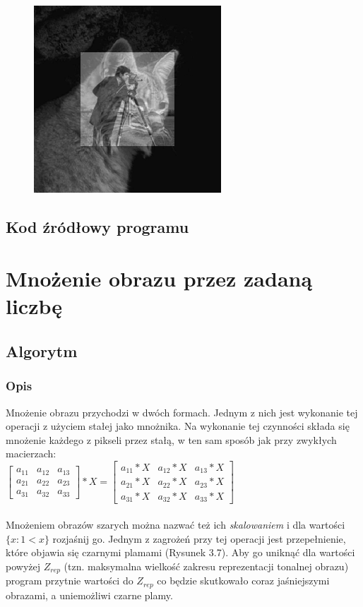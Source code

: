 \documentclass[a4paper,12pt]{book}
\begin{document}
\begin{figure}[H]
	\includegraphics[width=7cm, height=7cm]{2/sum-gray-images-2-norm.png}
\end{figure}

\subsection*{Kod źródłowy programu}

\section{Mnożenie obrazu przez zadaną liczbę}
\subsection*{Algorytm}
\subsubsection*{Opis}
Mnożenie obrazu przychodzi w dwóch formach. Jednym z nich jest wykonanie tej operacji z użyciem stałej jako mnożnika. Na wykonanie tej czynności składa się mnożenie każdego z pikseli przez stałą, w ten sam sposób jak przy zwykłych macierzach: \\
$
\begin{bmatrix}
a_{11} & a_{12} & a_{13}\\
a_{21} & a_{22} & a_{23}\\
a_{31} & a_{32} & a_{33}
\end{bmatrix}
* X = 
\begin{bmatrix}
a_{11} * X & a_{12} * X & a_{13} * X\\
a_{21} * X & a_{22} * X & a_{23} * X\\
a_{31} * X & a_{32} * X & a_{33} * X
\end{bmatrix}
$
\\\\
Mnożeniem obrazów szarych można nazwać też ich \textit{skalowaniem} i dla wartości $\{x: 1 < x\}$ rozjaśnij go. 
Jednym z zagrożeń przy tej operacji jest przepełnienie, które objawia się czarnymi plamami (Rysunek 3.7). Aby go uniknąć dla wartości powyżej  $Z_{rep}$ (tzn. maksymalna wielkość zakresu reprezentacji tonalnej obrazu) program przytnie wartości do $Z_{rep}$ co będzie skutkowało coraz jaśniejszymi obrazami, a uniemożliwi czarne plamy. 
\end{document}
